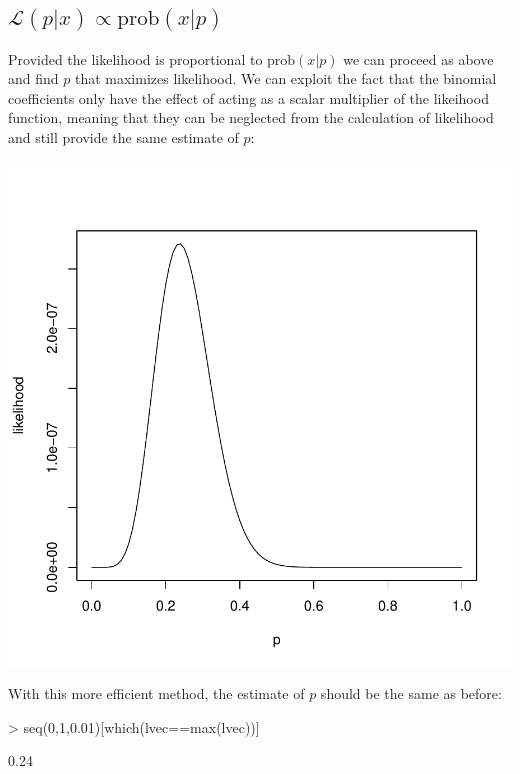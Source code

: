 \documentclass{article}
\begin{document}
\subsection*{$\mathcal{L} (p|x) \propto \text{prob}(x|p)$}
Provided the likelihood is proportional to $\text{prob} (x|p)$ we can proceed as above and find $p$ that maximizes likelihood. We can exploit the fact that the binomial coefficients only have the effect of acting as a scalar multiplier of the likeihood function, meaning that they can be neglected from the calculation of likelihood and still provide the same estimate of $p$:

\begin{Schunk}
\end{Schunk}
\includegraphics{chn_binom-008}

With this more efficient method, the estimate of $p$ should be the same as before:

\begin{Schunk}
\begin{Sinput}
> seq(0,1,0.01)[which(lvec==max(lvec))]
\end{Sinput}
\begin{Soutput}
[1] 0.24
\end{Soutput}
\end{Schunk}
\end{document}

